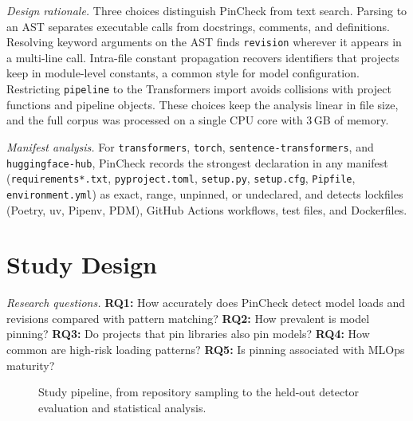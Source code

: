 \documentclass[conference]{IEEEtran}
\begin{document}
\textit{Design rationale.} Three choices distinguish PinCheck from text search. Parsing to an AST separates executable calls from docstrings, comments, and definitions. Resolving keyword arguments on the AST finds \texttt{revision} wherever it appears in a multi-line call. Intra-file constant propagation recovers identifiers that projects keep in module-level constants, a common style for model configuration. Restricting \texttt{pipeline} to the Transformers import avoids collisions with project functions and pipeline objects. These choices keep the analysis linear in file size, and the full corpus was processed on a single CPU core with 3\,GB of memory.

\textit{Manifest analysis.} For \texttt{transformers}, \texttt{torch}, \texttt{sentence-transformers}, and \texttt{huggingface-hub}, PinCheck records the strongest declaration in any manifest (\texttt{requirements*.txt}, \texttt{pyproject.toml}, \texttt{setup.py}, \texttt{setup.cfg}, \texttt{Pipfile}, \texttt{environment.yml}) as exact, range, unpinned, or undeclared, and detects lockfiles (Poetry, uv, Pipenv, PDM), GitHub Actions workflows, test files, and Dockerfiles.

\section{Study Design}
\textit{Research questions.} \textbf{RQ1:} How accurately does PinCheck detect model loads and revisions compared with pattern matching? \textbf{RQ2:} How prevalent is model pinning? \textbf{RQ3:} Do projects that pin libraries also pin models? \textbf{RQ4:} How common are high-risk loading patterns? \textbf{RQ5:} Is pinning associated with MLOps maturity?

\begin{figure}[t]
\centering
{}
\caption{Study pipeline, from repository sampling to the held-out detector evaluation and statistical analysis.}
\label{fig:pipeline}
\end{figure}
\end{document}
